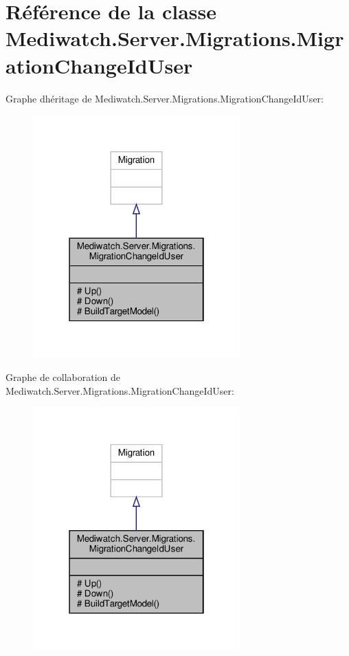 \hypertarget{class_mediwatch_1_1_server_1_1_migrations_1_1_migration_change_id_user}{}\section{Référence de la classe Mediwatch.\+Server.\+Migrations.\+Migration\+Change\+Id\+User}
\label{class_mediwatch_1_1_server_1_1_migrations_1_1_migration_change_id_user}


Graphe d\textquotesingle{}héritage de Mediwatch.\+Server.\+Migrations.\+Migration\+Change\+Id\+User\+:
\nopagebreak
\begin{figure}[H]
\begin{center}
\leavevmode
\includegraphics[width=226pt]{class_mediwatch_1_1_server_1_1_migrations_1_1_migration_change_id_user__inherit__graph}
\end{center}
\end{figure}


Graphe de collaboration de Mediwatch.\+Server.\+Migrations.\+Migration\+Change\+Id\+User\+:
\nopagebreak
\begin{figure}[H]
\begin{center}
\leavevmode
\includegraphics[width=226pt]{class_mediwatch_1_1_server_1_1_migrations_1_1_migration_change_id_user__coll__graph}
\end{center}
\end{figure}
